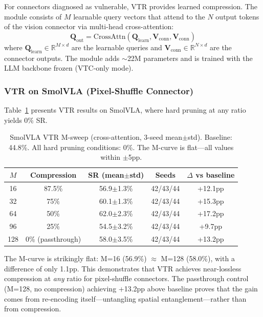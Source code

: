 \documentclass[letterpaper]{article}
\begin{document}
For connectors diagnosed as vulnerable, VTR provides learned compression. The module consists of $M$ learnable query vectors that attend to the $N$ output tokens of the vision connector via multi-head cross-attention:
\begin{equation}
\mathbf{Q}_{\text{out}} = \text{CrossAttn}(\mathbf{Q}_{\text{learn}}, \mathbf{V}_{\text{conn}}, \mathbf{V}_{\text{conn}})
\end{equation}
where $\mathbf{Q}_{\text{learn}} \in \mathbb{R}^{M \times d}$ are the learnable queries and $\mathbf{V}_{\text{conn}} \in \mathbb{R}^{N \times d}$ are the connector outputs. The module adds $\sim$22M parameters and is trained with the LLM backbone frozen (VTC-only mode).

\subsubsection{VTR on SmolVLA (Pixel-Shuffle Connector)}

Table~\ref{tab:smolvla_vtr} presents VTR results on SmolVLA, where hard pruning at any ratio yields 0\% SR.

\begin{table}[h]
\centering
\caption{SmolVLA VTR M-sweep (cross-attention, 3-seed mean$\pm$std). Baseline: 44.8\%. All hard pruning conditions: 0\%. The M-curve is flat---all values within $\pm$5pp.}
\label{tab:smolvla_vtr}
\small
\begin{tabular}{ccccc}
\toprule
$M$ & \textbf{Compression} & \textbf{SR (mean$\pm$std)} & \textbf{Seeds} & \textbf{$\Delta$ vs baseline} \\
\midrule
16 & 87.5\% & 56.9$\pm$1.3\% & 42/43/44 & +12.1pp \\
32 & 75\% & 60.1$\pm$1.3\% & 42/43/44 & +15.3pp \\
64 & 50\% & 62.0$\pm$2.3\% & 42/43/44 & +17.2pp \\
96 & 25\% & 54.5$\pm$3.2\% & 42/43/44 & +9.7pp \\
128 & 0\% (passthrough) & 58.0$\pm$3.5\% & 42/43/44 & +13.2pp \\
\bottomrule
\end{tabular}
\end{table}

The M-curve is strikingly flat: M=16 (56.9\%) $\approx$ M=128 (58.0\%), with a difference of only 1.1pp. This demonstrates that VTR achieves near-lossless compression at \emph{any} ratio for pixel-shuffle connectors. The passthrough control (M=128, no compression) achieving +13.2pp above baseline proves that the gain comes from re-encoding itself---untangling spatial entanglement---rather than from compression.
\end{document}

